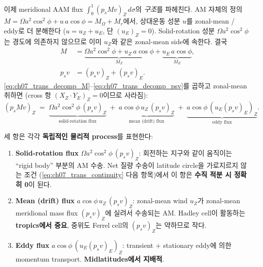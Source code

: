 이제 meridional AAM flux $\int_0^1 (p_s M v)_Z\,d\sigma$의 \textit{구조}를
파헤친다.  AM 자체의 정의 $M = \Omega a^2\cos^2\phi + u\,a\cos\phi
= M_\Omega + M_r$에서, 상대운동 성분 $u$를 zonal-mean / eddy로 더 분해한다
($u = u_Z + u_E$, 단 $(u_E)_Z = 0$).  Solid-rotation 성분 $\Omega a^2\cos^2\phi$는
경도에 의존하지 않으므로 이미 $u_Z$와 같은 zonal-mean side에 속한다.  결국
\begin{align}
  M &= \underbrace{\Omega a^2\cos^2\phi + u_Z\,a\cos\phi}_{M_Z}
       + \underbrace{u_E\,a\cos\phi}_{M_E},
     \label{eq:ch07_trans_decomp_M} \\
  p_s v &= (p_s v)_Z + (p_s v)_E.
     \label{eq:ch07_trans_decomp_psv}
\end{align}
\eqref{eq:ch07_trans_decomp_M}--\eqref{eq:ch07_trans_decomp_psv}를 곱하고
zonal-mean 취하면 (cross 항 $(X_Z\cdot Y_E)_Z = 0$이므로 사라짐):
\begin{equation}\label{eq:ch07_trans_three_flux}
  (p_s M v)_Z
  \;=\;
  \underbrace{\Omega a^2\cos^2\phi\,(p_s v)_Z}_{\text{solid-rotation flux}}
  \;+\;
  \underbrace{a\cos\phi\,u_Z\,(p_s v)_Z}_{\text{mean (drift) flux}}
  \;+\;
  \underbrace{a\cos\phi\,(u_E (p_s v)_E)_Z}_{\text{eddy flux}}.
\end{equation}

\begin{remark}\label{rem:ch07_trans_three_meaning}
세 항은 각각 \textbf{독립적인 물리적 process}를 표현한다:
\begin{enumerate}
  \item \textbf{Solid-rotation flux} $\Omega a^2\cos^2\phi\,(p_s v)_Z$:
    회전하는 지구와 같이 움직이는 ``rigid body'' 부분의 AM 수송.
    Net 질량 수송이 latitude circle을 가로지르지 않는 조건
    (\eqref{eq:ch07_trans_continuity} 다음 항목)에서 이 항은
    \textbf{수직 적분 시 정확히 0}이 된다.
  \item \textbf{Mean (drift) flux} $a\cos\phi\,u_Z\,(p_s v)_Z$:
    zonal-mean wind $u_Z$가 zonal-mean meridional mass flux $(p_s v)_Z$에
    실려서 수송되는 AM.  Hadley cell이 활동하는 \textbf{tropics에서 중요},
    중위도 Ferrel cell의 $(p_s v)_Z$는 약하므로 작다.
  \item \textbf{Eddy flux} $a\cos\phi\,(u_E(p_s v)_E)_Z$: transient + stationary
    eddy에 의한 momentum transport.  \textbf{Midlatitudes에서 지배적}.
\end{enumerate}
\end{remark}


